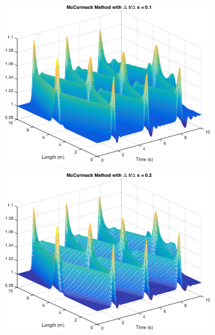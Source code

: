 \begin{figure}
\begin{center}
\includegraphics[scale=0.6]{mccormack01.eps}
\label{reg}
\end{center}
\end{figure}

\begin{figure}
\begin{center}
\includegraphics[scale=0.6]{mccormack02.eps}
\label{reg}
\end{center}
\end{figure}

